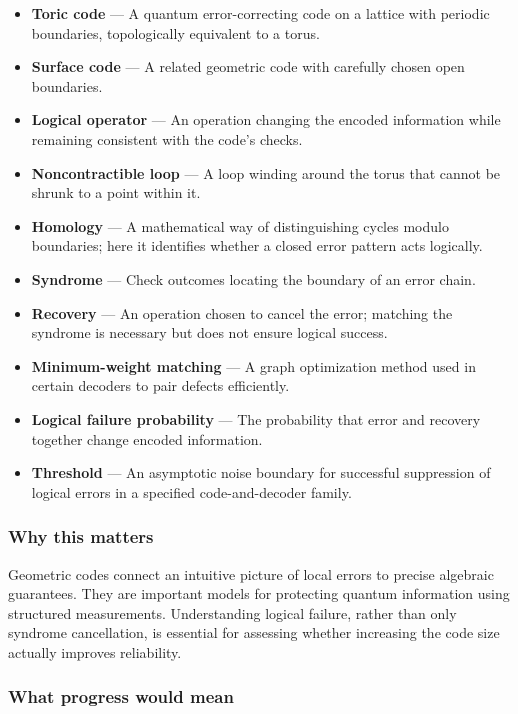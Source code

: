 \documentclass[
  11pt,
]{article}
\begin{document}
\begin{itemize}
\item
  \textbf{Toric code} --- A quantum error-correcting code on a lattice
  with periodic boundaries, topologically equivalent to a torus.
\item
  \textbf{Surface code} --- A related geometric code with carefully
  chosen open boundaries.
\item
  \textbf{Logical operator} --- An operation changing the encoded
  information while remaining consistent with the code's checks.
\item
  \textbf{Noncontractible loop} --- A loop winding around the torus that
  cannot be shrunk to a point within it.
\item
  \textbf{Homology} --- A mathematical way of distinguishing cycles
  modulo boundaries; here it identifies whether a closed error pattern
  acts logically.
\item
  \textbf{Syndrome} --- Check outcomes locating the boundary of an error
  chain.
\item
  \textbf{Recovery} --- An operation chosen to cancel the error;
  matching the syndrome is necessary but does not ensure logical
  success.
\item
  \textbf{Minimum-weight matching} --- A graph optimization method used
  in certain decoders to pair defects efficiently.
\item
  \textbf{Logical failure probability} --- The probability that error
  and recovery together change encoded information.
\item
  \textbf{Threshold} --- An asymptotic noise boundary for successful
  suppression of logical errors in a specified code-and-decoder family.
\end{itemize}

\subsubsection{Why this matters}

Geometric codes connect an intuitive picture of local errors to precise
algebraic guarantees. They are important models for protecting quantum
information using structured measurements. Understanding logical
failure, rather than only syndrome cancellation, is essential for
assessing whether increasing the code size actually improves
reliability.

\subsubsection{What progress would mean}
\end{document}
